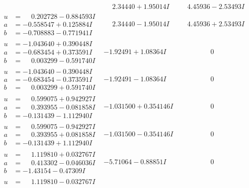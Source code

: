 \documentclass[1p]{elsarticle_modified}
\theoremstyle{definition}
\begin{document}
$$\begin{array}{c|c|c}
 & \phantom{-}2.34440 + 1.95014 I & \phantom{-}4.45936 - 2.53493 I \\ \hline\begin{aligned}
u &= \phantom{-}0.202728 - 0.884593 I \\
a &= -0.558547 + 0.125884 I \\
b &= -0.708883 - 0.771941 I\end{aligned}
 & \phantom{-}2.34440 - 1.95014 I & \phantom{-}4.45936 + 2.53493 I \\ \hline\begin{aligned}
u &= -1.043640 + 0.390448 I \\
a &= -0.683454 + 0.373591 I \\
b &= \phantom{-}0.003299 - 0.591740 I\end{aligned}
 & -1.92491 + 1.08364 I & \phantom{-0.000000 } 0 \\ \hline\begin{aligned}
u &= -1.043640 - 0.390448 I \\
a &= -0.683454 - 0.373591 I \\
b &= \phantom{-}0.003299 + 0.591740 I\end{aligned}
 & -1.92491 - 1.08364 I & \phantom{-0.000000 } 0 \\ \hline\begin{aligned}
u &= \phantom{-}0.599075 + 0.942927 I \\
a &= \phantom{-}0.393955 - 0.081858 I \\
b &= -0.131439 - 1.112940 I\end{aligned}
 & -1.031500 + 0.354146 I & \phantom{-0.000000 } 0 \\ \hline\begin{aligned}
u &= \phantom{-}0.599075 - 0.942927 I \\
a &= \phantom{-}0.393955 + 0.081858 I \\
b &= -0.131439 + 1.112940 I\end{aligned}
 & -1.031500 - 0.354146 I & \phantom{-0.000000 } 0 \\ \hline\begin{aligned}
u &= \phantom{-}1.119810 + 0.032767 I \\
a &= \phantom{-}0.413302 - 0.046036 I \\
b &= -1.43154 - 0.47309 I\end{aligned}
 & -5.71064 - 0.88851 I & \phantom{-0.000000 } 0 \\ \hline\begin{aligned}
u &= \phantom{-}1.119810 - 0.032767 I \\

\end{aligned}
\end{array}$$
\end{document}
